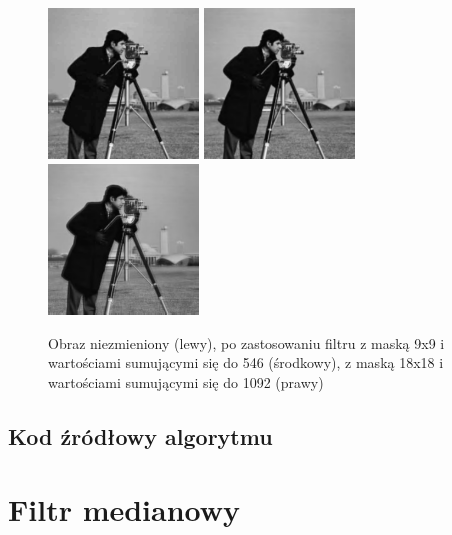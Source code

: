 \documentclass[a4paper,12pt]{book}
\begin{document}
			\begin{figure}[H]
				\caption{Obraz niezmieniony (lewy), po zastosowaniu filtru z maską 9x9 i wartościami sumującymi się do 546 (środkowy), z maską 18x18 i wartościami sumującymi się do 1092 (prawy)}
				\includegraphics[width=4cm, height=4cm]{man-unmodified.jpg}
				\includegraphics[width=4cm, height=4cm]{man-filter-gaussianblur9x9f546.png}
				\includegraphics[width=4cm, height=4cm]{man-filter-gaussianblur18x18f1092.png}
			\end{figure}
		\subsection{Kod źródłowy algorytmu}
	\section{Filtr medianowy}
\end{document}
